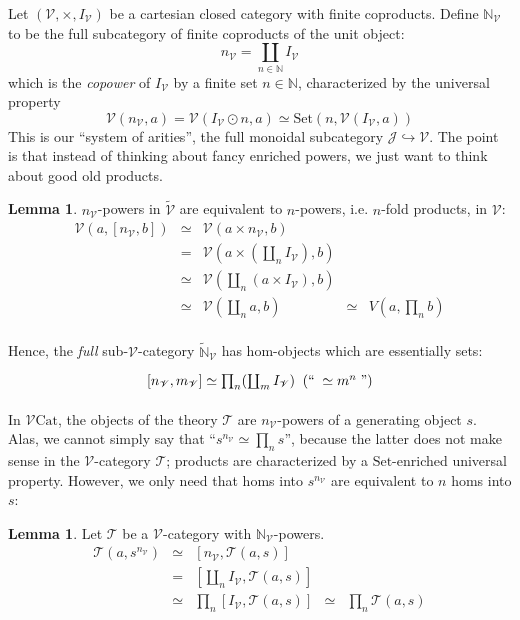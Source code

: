 \documentclass[a4paper,UKenglish]{article}
\theoremstyle{definition}
\newtheorem{lemma}[theorem]{Lemma}
\newcommand{\Set}{\mathrm{Set}}
\newcommand{\Cat}{\mathrm{Cat}}
\newcommand{\NN}{\mathbb{N}}
\newcommand{\V}{\mathscr{V}}
\newcommand{\T}{\mathscr{T}}
\newcommand{\J}{\mathscr{J}}
\begin{document}
Let $(\V,\times,I_\V)$ be a cartesian closed category with finite coproducts. Define $\NN_\V$ to be the full subcategory of finite coproducts of the unit object: $$n_\V = \coprod_{n \in \NN} I_\V$$ which is the \textit{copower} of $I_\V$ by a finite set $n \in \NN$, characterized by the universal property $$\V(n_\V,a) = \V(I_\V \odot n,a) \simeq \Set(n,\V(I_\V,a))$$ This is our ``system of arities'', the full monoidal subcategory $\J \hookrightarrow \V$. The point is that instead of thinking about fancy enriched powers, we just want to think about good old products.

\begin{lemma} $n_\V$-powers in $\tilde{\V}$ are equivalent to $n$-powers, i.e. $n$-fold products, in $\V$:
	\[\begin{array}{rclcl}
	\V(a,[n_\V,b]) & \simeq & \V(a\times n_\V,b) & &\\
	& = & \V(a\times (\coprod_n I_\V),b) & &\\
	& \simeq & \V(\coprod_n(a\times I_\V),b) & &\\
	& \simeq & \V(\coprod_n a,b) & \simeq & V(a,\prod_n b)\\
	\end{array}\]
\end{lemma}

Hence, the \textit{full} sub-$\V$-category $\tilde{\NN}_\V$ has hom-objects which are essentially sets:
\[\begin{tikzcd}
\left[n_\V,m_\V\right] \simeq \prod_n (\coprod_m I_\V) \;\; (`` \; \simeq m^n \;")
\end{tikzcd}\]

In $\V\Cat$, the objects of the theory $\T$ are $n_\V$-powers of a generating object $s$. Alas, we cannot simply say that ``$s^{n_\V} \simeq \prod_n s$'', because the latter does not make sense in the $\V$-category $\T$; products are characterized by a $\Set$-enriched universal property. However, we only need that homs into $s^{n_\V}$ are equivalent to $n$ homs into $s$:

\begin{lemma}
	Let $\T$ be a $\V$-category with $\NN_\V$-powers.
	\[\begin{array}{rclcl}
	\T(a,s^{n_\V}) & \simeq & [n_\V,\T(a,s)] & &\\
	& = & [\coprod_n I_\V,\T(a,s)] & &\\
	& \simeq & \prod_n [I_\V,\T(a,s)] & \simeq & \prod_n \T(a,s)
	\end{array}\]
\end{lemma}
\end{document}
